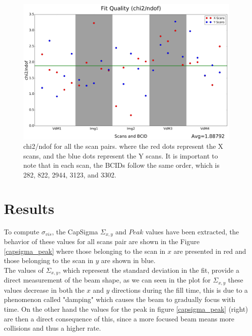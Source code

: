\begin{center}
  \begin{figure}[h!]
    \centering
    \includegraphics[scale=.025]{Chapter4/DGConst_chi2.png}
    \caption[chi2/ndof for all scan pairs]{ chi2/ndof for all the scan pairs.  where the red dots represent the X scans, and the blue dots represent the Y scans. It is important to note that in each scan, the BCIDs follow the same order, which is 282, 822, 2944, 3123, and 3302.} 
    \label{chi2/ndof}
  \end{figure}
\end{center}

\section{Results}

To compute $\sigma_{vis}$, the CapSigma $\Sigma_{x,y}$ and $Peak$ values have been extracted, the behavior of these values ​​for all scans pair are shown in the  Figure \ref{capsigma_peak} where those belonging to the scan in $x$ are presented in red and those belonging to the scan in $y$ are shown in blue.\\

The values of $\Sigma_{x,y}$, which represent the standard deviation in the fit, provide a direct measurement of the beam shape, as we can seen in the plot for $\Sigma_{x,y}$  these values decrease in both the $x$ and $y$ directions during the fill time, this is due to a phenomenon called "damping" which causes the beam to gradually focus with time. On the other hand the values ​​for the peak in figure \ref{capsigma_peak} (right) are then a direct consequence of this, since a more focused beam means more collisions and thus a higher rate.\\

